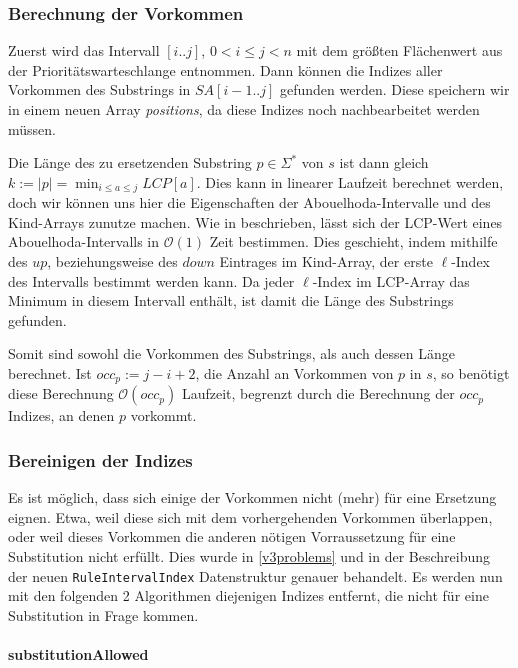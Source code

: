 \subsubsection{Berechnung der Vorkommen}

Zuerst wird das Intervall $[i..j]$, $0 < i \leq j < n$ mit dem größten Flächenwert aus der Prioritätswarteschlange entnommen. Dann können die Indizes aller Vorkommen des Substrings in $SA[i-1..j]$ gefunden werden. Diese speichern wir in einem neuen Array \emph{positions}, da diese Indizes noch nachbearbeitet werden müssen.

Die Länge des zu ersetzenden Substring $p \in \Sigma^*$ von $s$ ist dann gleich $k := |p| = \min_{i \leq a \leq j} LCP[a]$.
Dies kann in linearer Laufzeit berechnet werden, doch wir können uns hier die Eigenschaften der Abouelhoda-Intervalle und des Kind-Arrays zunutze machen. 
Wie in \cite{abouelhoda_optimal_2002} beschrieben, lässt sich der LCP-Wert eines Abouelhoda-Intervalls in $\mathcal{O}(1)$ Zeit bestimmen. Dies geschieht, indem mithilfe des $up$, beziehungsweise des $down$ Eintrages im Kind-Array, der erste $\ell$-Index des Intervalls bestimmt werden kann. Da jeder $\ell$-Index im LCP-Array das Minimum in diesem Intervall enthält, ist damit die Länge des Substrings gefunden.

Somit sind sowohl die Vorkommen des Substrings, als auch dessen Länge berechnet. Ist $occ_p := j - i + 2$, die Anzahl an Vorkommen von $p$ in $s$, so benötigt diese Berechnung $\mathcal{O}(occ_p)$ Laufzeit, begrenzt durch die Berechnung der $occ_p$ Indizes, an denen $p$ vorkommt.

\subsubsection{Bereinigen der Indizes}

Es ist möglich, dass sich einige der Vorkommen nicht (mehr) für eine Ersetzung eignen. Etwa, weil diese sich mit dem vorhergehenden Vorkommen überlappen, oder weil dieses Vorkommen die anderen nötigen Vorraussetzung für eine Substitution nicht erfüllt. Dies wurde in \autoref{v3problems} und in der Beschreibung der neuen \texttt{RuleIntervalIndex} Datenstruktur genauer behandelt. Es werden nun mit den folgenden 2 Algorithmen diejenigen Indizes entfernt, die nicht für eine Substitution in Frage kommen.

\paragraph{substitutionAllowed}

